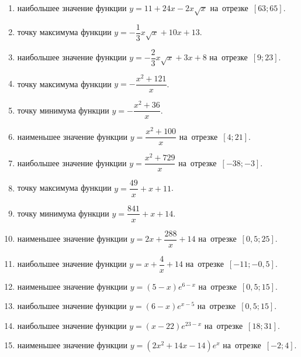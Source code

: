 \documentclass[a4paper,10pt]{article}
\begin{document}
\begin{enumerate}
\item {} наибольшее значение функции $y=11+24x -2x\sqrt{x}$ на~отрезке~$\left[63;65\right]$.

\item {} точку максимума функции $y=-\dfrac{1}{3}x\sqrt{x} +10x+13$.

\item {} наибольшее значение функции $y=-\dfrac{2}{3}x\sqrt{x} +3x+8$ на~отрезке~$\left[9;23\right]$.

\item {} точку максимума функции $y=-\dfrac{x^2 +121}{x}$.

\item {} точку минимума функции $y=-\dfrac{x^2 +36}{x}$.

\item {} наименьшее значение функции $y=\dfrac{x^2 +100}{x}$ на~отрезке~$\left[4;21\right]$.

\item {} наибольшее значение функции $y=\dfrac{x^2 +729}{x}$ на~отрезке~$\left[-38;-3\right]$.

\item {} точку максимума функции $y=\dfrac{49}{x} +x+11$.

\item {} точку минимума функции $y=\dfrac{841}{x} +x+14$.

\item {} наименьшее значение функции $y=2x+\dfrac{288}{x} +14$ на~отрезке~$\left[0,5;25\right]$.

\item {} наибольшее значение функции $y=x+\dfrac{4}{x} +14$ на~отрезке~$\left[-11;-0,5\right]$.

\item {} наименьшее значение функции $y=\left(5-x\right)e^{6-x}$ на~отрезке~$\left[0,5;15\right]$.

\item {} наибольшее значение функции $y=\left(6-x\right)e^{x-5}$ на~отрезке~$\left[0,5;15\right]$.

\item {} наибольшее значение функции $y=\left(x-22\right)e^{23-x}$ на~отрезке~$\left[18;31\right]$.

\item {} наименьшее значение функции $y=\left(2x^2 +14x -14\right)e^{x }$ на~отрезке~$\left[-2;4\right]$.


\end{enumerate}
\end{document}
